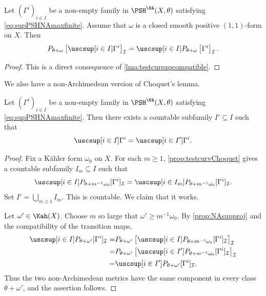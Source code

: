 \begin{proposition}\label{prop:NAsupproj}
    Let $(\Gamma^i)_{i\in I}$ be a non-empty family in $\PSH^{\NA}(X,\theta)$ satisfying \eqref{eq:supPSHNAmaxfinite}. Assume that $\omega$ is a closed smooth positive $(1,1)$-form on $X$. Then
    \[
    P_{\theta+\omega}\left[ \uscsup[i\in I] \Gamma^{i} \right]_{\mathcal{I}}= \uscsup[i\in I] P_{\theta+\omega}\left[ \Gamma^{i} \right]_{\mathcal{I}}.
    \]
\end{proposition}
\begin{proof}
    This is a direct consequence of \cref{lma:testcursupcompatible}.
\end{proof}

We also have a non-Archimedean version of Choquet's lemma.
\begin{proposition}\label{prop:NAChoquet}
    Let $(\Gamma^i)_{i\in I}$ be a non-empty family in $\PSH^{\NA}(X,\theta)$ satisfying \eqref{eq:supPSHNAmaxfinite}. Then there exists a countable subfamily $I'\subseteq I$ such that
    \[
        \uscsup[i\in I]\Gamma^i=\uscsup[i\in I']\Gamma^i.
    \]
\end{proposition}
\begin{proof}
    Fix a K\"ahler form $\omega_0$ on $X$. For each $m\geq 1$, \cref{prop:testcurvChoquet} gives a countable subfamily $I_m\subseteq I$ such that
    \[
    \uscsup[i\in I]P_{\theta+m^{-1}\omega_0}[\Gamma^i]_{\mathcal{I}}=\uscsup[i\in I_m]P_{\theta+m^{-1}\omega_0}[\Gamma^i]_{\mathcal{I}}.
    \]
    Set $I'=\bigcup_{m\geq 1}I_m$. This is countable. We claim that it works.

    Let $\omega'\in \Kah(X)$. Choose $m$ so large that $\omega'\geq m^{-1}\omega_0$. By \cref{prop:NAsupproj} and the compatibility of the transition maps,
    \[
    \begin{aligned}
    \uscsup[i\in I]P_{\theta+\omega'}[\Gamma^i]_{\mathcal{I}}
    =&P_{\theta+\omega'}\left[\uscsup[i\in I]P_{\theta+m^{-1}\omega_0}[\Gamma^i]_{\mathcal{I}}\right]_{\mathcal{I}}\\
    =&P_{\theta+\omega'}\left[\uscsup[i\in I']P_{\theta+m^{-1}\omega_0}[\Gamma^i]_{\mathcal{I}}\right]_{\mathcal{I}}\\
    =&\uscsup[i\in I']P_{\theta+\omega'}[\Gamma^i]_{\mathcal{I}}.
    \end{aligned}
    \]
    Thus the two non-Archimedean metrics have the same component in every class $\theta+\omega'$, and the assertion follows.
\end{proof}

